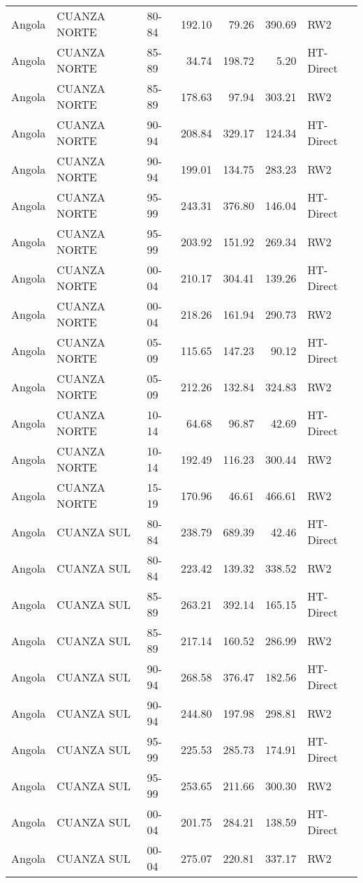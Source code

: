 \begin{longtable}{lllrrrl}
  Angola & CUANZA NORTE & 80-84 & 192.10 & 79.26 & 390.69 & RW2 \\ 
  Angola & CUANZA NORTE & 85-89 & 34.74 & 198.72 & 5.20 & HT-Direct \\ 
  Angola & CUANZA NORTE & 85-89 & 178.63 & 97.94 & 303.21 & RW2 \\ 
  Angola & CUANZA NORTE & 90-94 & 208.84 & 329.17 & 124.34 & HT-Direct \\ 
  Angola & CUANZA NORTE & 90-94 & 199.01 & 134.75 & 283.23 & RW2 \\ 
  Angola & CUANZA NORTE & 95-99 & 243.31 & 376.80 & 146.04 & HT-Direct \\ 
  Angola & CUANZA NORTE & 95-99 & 203.92 & 151.92 & 269.34 & RW2 \\ 
  Angola & CUANZA NORTE & 00-04 & 210.17 & 304.41 & 139.26 & HT-Direct \\ 
  Angola & CUANZA NORTE & 00-04 & 218.26 & 161.94 & 290.73 & RW2 \\ 
  Angola & CUANZA NORTE & 05-09 & 115.65 & 147.23 & 90.12 & HT-Direct \\ 
  Angola & CUANZA NORTE & 05-09 & 212.26 & 132.84 & 324.83 & RW2 \\ 
  Angola & CUANZA NORTE & 10-14 & 64.68 & 96.87 & 42.69 & HT-Direct \\ 
  Angola & CUANZA NORTE & 10-14 & 192.49 & 116.23 & 300.44 & RW2 \\ 
  Angola & CUANZA NORTE & 15-19 & 170.96 & 46.61 & 466.61 & RW2 \\ 
  Angola & CUANZA SUL & 80-84 & 238.79 & 689.39 & 42.46 & HT-Direct \\ 
  Angola & CUANZA SUL & 80-84 & 223.42 & 139.32 & 338.52 & RW2 \\ 
  Angola & CUANZA SUL & 85-89 & 263.21 & 392.14 & 165.15 & HT-Direct \\ 
  Angola & CUANZA SUL & 85-89 & 217.14 & 160.52 & 286.99 & RW2 \\ 
  Angola & CUANZA SUL & 90-94 & 268.58 & 376.47 & 182.56 & HT-Direct \\ 
  Angola & CUANZA SUL & 90-94 & 244.80 & 197.98 & 298.81 & RW2 \\ 
  Angola & CUANZA SUL & 95-99 & 225.53 & 285.73 & 174.91 & HT-Direct \\ 
  Angola & CUANZA SUL & 95-99 & 253.65 & 211.66 & 300.30 & RW2 \\ 
  Angola & CUANZA SUL & 00-04 & 201.75 & 284.21 & 138.59 & HT-Direct \\ 
  Angola & CUANZA SUL & 00-04 & 275.07 & 220.81 & 337.17 & RW2 \\ 

\end{longtable}
